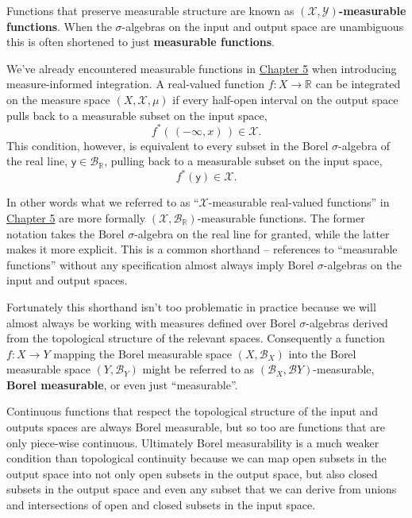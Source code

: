 \documentclass[
  letterpaper,
  DIV=11,
  numbers=noendperiod]{scrartcl}
\begin{document}
Functions that preserve measurable structure are known as
\textbf{\((\mathcal{X}, \mathcal{Y})\)-measurable functions}. When the
\(\sigma\)-algebras on the input and output space are unambiguous this
is often shortened to just \textbf{measurable functions}.

We've already encountered measurable functions in
\href{https://betanalpha.github.io/assets/chapters_html/expectation_values.html}{Chapter
5} when introducing measure-informed integration. A real-valued function
\(f : X \rightarrow \mathbb{R}\) can be integrated on the measure space
\((X, \mathcal{X}, \mu)\) if every half-open interval on the output
space pulls back to a measurable subset on the input space, \[
f^{*}( \, (-\infty, x) \, ) \in \mathcal{X}.
\] This condition, however, is equivalent to every subset in the Borel
\(\sigma\)-algebra of the real line,
\(\mathsf{y} \in \mathcal{B}_{\mathbb{R}}\), pulling back to a
measurable subset on the input space, \[
f^{*}( \mathsf{y} ) \in \mathcal{X}.
\]

In other words what we referred to as ``\(\mathcal{X}\)-measurable
real-valued functions'' in
\href{https://betanalpha.github.io/assets/chapters_html/expectation_values.html}{Chapter
5} are more formally
\((\mathcal{X}, \mathcal{B}_{\mathbb{R}})\)-measurable functions. The
former notation takes the Borel \(\sigma\)-algebra on the real line for
granted, while the latter makes it more explicit. This is a common
shorthand -- references to ``measurable functions'' without any
specification almost always imply Borel \(\sigma\)-algebras on the input
and output spaces.

Fortunately this shorthand isn't too problematic in practice because we
will almost always be working with measures defined over Borel
\(\sigma\)-algebras derived from the topological structure of the
relevant spaces. Consequently a function \(f : X \rightarrow Y\) mapping
the Borel measurable space \((X, \mathcal{B}_{X})\) into the Borel
measurable space \((Y, \mathcal{B}_{Y})\) might be referred to as
\((\mathcal{B}_{X}, \mathcal{B}{Y})\)-measurable, \textbf{Borel
measurable}, or even just ``measurable''.

Continuous functions that respect the topological structure of the input
and outputs spaces are always Borel measurable, but so too are functions
that are only piece-wise continuous. Ultimately Borel measurability is a
much weaker condition than topological continuity because we can map
open subsets in the output space into not only open subsets in the
output space, but also closed subsets in the output space and even any
subset that we can derive from unions and intersections of open and
closed subsets in the input space.
\end{document}

